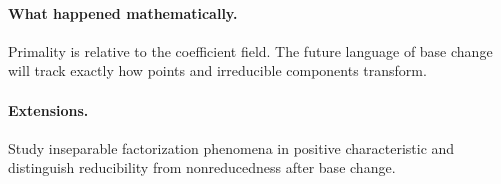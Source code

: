 \paragraph{What happened mathematically.}
Primality is relative to the coefficient field.  The future language of base change will
track exactly how points and irreducible components transform.

\paragraph{Extensions.}
Study inseparable factorization phenomena in positive characteristic and distinguish
reducibility from nonreducedness after base change.
\fi
